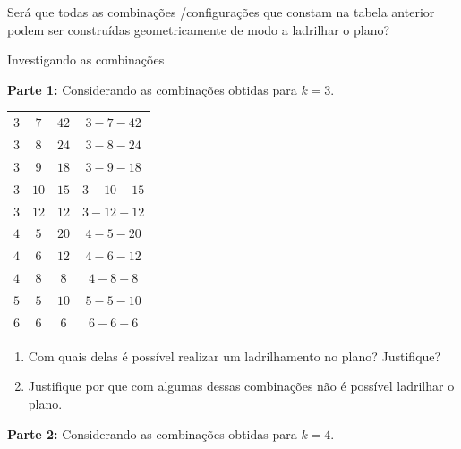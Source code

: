 Será que todas as  combinações /configurações que constam na tabela anterior podem ser construídas geometricamente de modo a ladrilhar o plano?


 \label{at_ladsemi}

\begin{task} {Investigando as combinações}

\textbf{Parte 1:} Considerando as  combinações obtidas para $k=3$.
 
\begin{table}[H]
\centering
\setlength\tabcolsep{5mm}
\begin{tabu} to \textwidth{|c|c|c|c|}
\hline
{} &  &  &   \\
\hline
$3$ & $7$ & $42$ & $3-7-42$ \\
\hline
$3$ & $8$ & $24$ &  $3-8-24$ \\
\hline
$3$ & $9$ & $18$ &  $3-9-18$ \\
\hline
$3$ & $10$ & $15$ &  $ 3-10-15$ \\
\hline
$3$ & $12$ & $12$ &  $3-12-12$ \\
\hline
$4$ & $5$ & $20$ &  $4-5-20$ \\
\hline
$4$ & $6$ & $12$ &  $4-6-12$ \\
\hline
$4$ & $8$ & $8$ &  $4-8-8$ \\
\hline
$5$ & $5$ & $10$ &  $5-5-10$ \\
\hline
$6$ & $6$ & $6$ &  $6-6-6$ \\
\hline
\end{tabu}
\end{table}

\begin{enumerate}

\item	Com quais delas é possível realizar um ladrilhamento no plano? Justifique?
\item	Justifique por que com algumas dessas combinações não é possível ladrilhar o plano.

\end{enumerate}

\textbf{Parte 2:} Considerando as  combinações obtidas para $k=4$. 

\begin{table}[H]
\centering
\setlength\tabcolsep{5mm}
\begin{tabu} to \textwidth{|c|c|c|c|c|}
\hline
{} &  &  & &   \\
\hline


\end{tabu}
\end{table}
\end{task}
